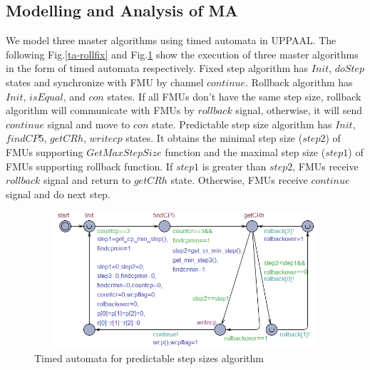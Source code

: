 \subsection{Modelling and Analysis of MA} 
We model three master algorithms using timed automata in UPPAAL. The following Fig.\ref{ta-rollfix} and Fig.\ref{ta-pre} show the execution of three master algorithms in the form of timed automata respectively. Fixed step algorithm has $Init$, $doStep$ states and synchronize with FMU by channel $continue$. Rollback algorithm has $Init$, $isEqual$, and $con$ states. If all FMUs don't have the same step size, rollback algorithm will communicate with FMUs by $rollback$ signal, otherwise, it will send $continue$ signal and move to $con$ state. Predictable step size algorithm has $Init$, $findCP5$, $getCRh$, $writecp$ states. It obtains the minimal step size ($step2$) of FMUs supporting $GetMaxStepSize$ function and the maximal step size ($step1$) of FMUs supporting rollback function. If $step1$ is greater than $step2$, FMUs receive $rollback$ signal and return to $getCRh$ state. Otherwise, FMUs receive $continue$ signal and do next step.  
\begin{figure}[htbp]
\end{figure}
\begin{figure}[htbp]
\begin{center}
\includegraphics[width=4.8in,height=2.0in]{fig/pma_master.png}
\caption{Timed automata for predictable step sizes algorithm}
\label{ta-pre}
\end{center}
\end{figure}
